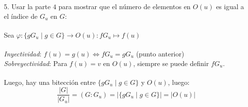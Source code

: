 \documentclass{article}
\begin{document}
5. Usar la parte $4$ para mostrar que el número de elementos en $O(u)$ es igual a el índice de $G_{u}$ en $G$:
\\
\\
Sea $\varphi: \{gG_{u} \mid g \in G \} \to O(u): fG_{u} \mapsto f(u)$
\\
\\
\textit{Inyectividad}: $f(u)=g(u) \Longleftrightarrow fG_{u}=gG_{u}$ (punto anterior)
\\
\textit{Sobreyectividad}: Para $f(u)=v$ en $O(u)$, siempre se puede definir $fG_{u}$.
\\
\\
Luego, hay una bitección entre $\{gG_{u} \mid g \in G \}$ y $O(u)$, luego:
\begin{equation*}
    \frac{|G|}{|G_{u}|}=(G:G_{u})=|\{gG_{u} \mid g \in G \}| = |O(u)|
\end{equation*}
\end{document}
